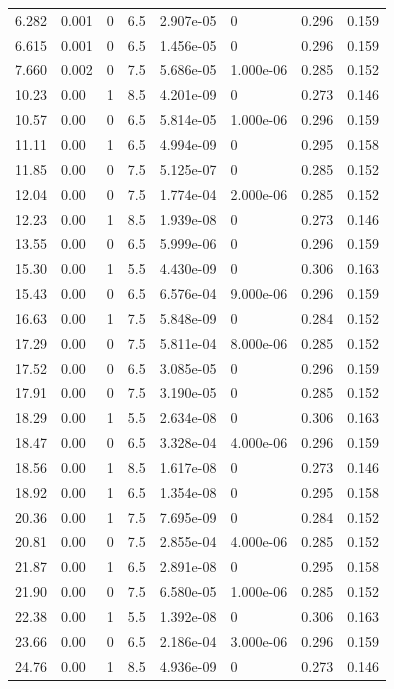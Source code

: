 \documentclass[preview]{standalone}
\begin{document}
{{\begin{tabular}{L{1.2cm}C{1.2cm} C{0.3cm}C{0.5cm} C{1.4cm}C{1.4cm} C{1.4cm}C{1.4cm}}
  6.282  &  0.001  & 0     & 6.5 &  2.907e-05  & 0  & 0.296 &  0.159   \\ 
  6.615  &  0.001  & 0     & 6.5 &  1.456e-05  & 0  & 0.296 &  0.159   \\ 
  7.660  &  0.002  & 0     & 7.5 &  5.686e-05  & 1.000e-06  & 0.285 &  0.152   \\ 
  10.23  &  0.00  & 1     & 8.5 &  4.201e-09  & 0  & 0.273 &  0.146   \\ 
  10.57  &  0.00  & 0     & 6.5 &  5.814e-05  & 1.000e-06  & 0.296 &  0.159   \\ 
  11.11  &  0.00  & 1     & 6.5 &  4.994e-09  & 0  & 0.295 &  0.158   \\ 
  11.85  &  0.00  & 0     & 7.5 &  5.125e-07  & 0  & 0.285 &  0.152   \\ 
  12.04  &  0.00  & 0     & 7.5 &  1.774e-04  & 2.000e-06  & 0.285 &  0.152   \\ 
  12.23  &  0.00  & 1     & 8.5 &  1.939e-08  & 0  & 0.273 &  0.146   \\ 
  13.55  &  0.00  & 0     & 6.5 &  5.999e-06  & 0  & 0.296 &  0.159   \\ 
  15.30  &  0.00  & 1     & 5.5 &  4.430e-09  & 0  & 0.306 &  0.163   \\ 
  15.43  &  0.00  & 0     & 6.5 &  6.576e-04  & 9.000e-06  & 0.296 &  0.159   \\ 
  16.63  &  0.00  & 1     & 7.5 &  5.848e-09  & 0  & 0.284 &  0.152   \\ 
  17.29  &  0.00  & 0     & 7.5 &  5.811e-04  & 8.000e-06  & 0.285 &  0.152   \\ 
  17.52  &  0.00  & 0     & 6.5 &  3.085e-05  & 0  & 0.296 &  0.159   \\ 
  17.91  &  0.00  & 0     & 7.5 &  3.190e-05  & 0  & 0.285 &  0.152   \\ 
  18.29  &  0.00  & 1     & 5.5 &  2.634e-08  & 0  & 0.306 &  0.163   \\ 
  18.47  &  0.00  & 0     & 6.5 &  3.328e-04  & 4.000e-06  & 0.296 &  0.159   \\ 
  18.56  &  0.00  & 1     & 8.5 &  1.617e-08  & 0  & 0.273 &  0.146   \\ 
  18.92  &  0.00  & 1     & 6.5 &  1.354e-08  & 0  & 0.295 &  0.158   \\ 
  20.36  &  0.00  & 1     & 7.5 &  7.695e-09  & 0  & 0.284 &  0.152   \\ 
  20.81  &  0.00  & 0     & 7.5 &  2.855e-04  & 4.000e-06  & 0.285 &  0.152   \\ 
  21.87  &  0.00  & 1     & 6.5 &  2.891e-08  & 0  & 0.295 &  0.158   \\ 
  21.90  &  0.00  & 0     & 7.5 &  6.580e-05  & 1.000e-06  & 0.285 &  0.152   \\ 
  22.38  &  0.00  & 1     & 5.5 &  1.392e-08  & 0  & 0.306 &  0.163   \\ 
  23.66  &  0.00  & 0     & 6.5 &  2.186e-04  & 3.000e-06  & 0.296 &  0.159   \\ 
  24.76  &  0.00  & 1     & 8.5 &  4.936e-09  & 0  & 0.273 &  0.146   \\ 
\hline 
\end{tabular} 

}}
\end{document}
